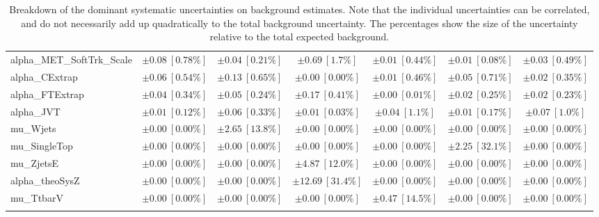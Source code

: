 \begin{sidewaystable}
\begin{center}
\begin{tabular*}{\textwidth}{@{\extracolsep{\fill}}lcccccc}
alpha\_MET\_SoftTrk\_Scale         & $\pm 0.08\ [0.78\%] $          & $\pm 0.04\ [0.21\%] $          & $\pm 0.69\ [1.7\%] $          & $\pm 0.01\ [0.44\%] $          & $\pm 0.01\ [0.08\%] $          & $\pm 0.03\ [0.49\%] $       \\
alpha\_CExtrap         & $\pm 0.06\ [0.54\%] $          & $\pm 0.13\ [0.65\%] $          & $\pm 0.00\ [0.00\%] $          & $\pm 0.01\ [0.46\%] $          & $\pm 0.05\ [0.71\%] $          & $\pm 0.02\ [0.35\%] $       \\
alpha\_FTExtrap         & $\pm 0.04\ [0.34\%] $          & $\pm 0.05\ [0.24\%] $          & $\pm 0.17\ [0.41\%] $          & $\pm 0.00\ [0.01\%] $          & $\pm 0.02\ [0.25\%] $          & $\pm 0.02\ [0.23\%] $       \\
alpha\_JVT         & $\pm 0.01\ [0.12\%] $          & $\pm 0.06\ [0.33\%] $          & $\pm 0.01\ [0.03\%] $          & $\pm 0.04\ [1.1\%] $          & $\pm 0.01\ [0.17\%] $          & $\pm 0.07\ [1.0\%] $       \\
mu\_Wjets         & $\pm 0.00\ [0.00\%] $          & $\pm 2.65\ [13.8\%] $          & $\pm 0.00\ [0.00\%] $          & $\pm 0.00\ [0.00\%] $          & $\pm 0.00\ [0.00\%] $          & $\pm 0.00\ [0.00\%] $       \\
mu\_SingleTop         & $\pm 0.00\ [0.00\%] $          & $\pm 0.00\ [0.00\%] $          & $\pm 0.00\ [0.00\%] $          & $\pm 0.00\ [0.00\%] $          & $\pm 2.25\ [32.1\%] $          & $\pm 0.00\ [0.00\%] $       \\
mu\_ZjetsE         & $\pm 0.00\ [0.00\%] $          & $\pm 0.00\ [0.00\%] $          & $\pm 4.87\ [12.0\%] $          & $\pm 0.00\ [0.00\%] $          & $\pm 0.00\ [0.00\%] $          & $\pm 0.00\ [0.00\%] $       \\
alpha\_theoSysZ         & $\pm 0.00\ [0.00\%] $          & $\pm 0.00\ [0.00\%] $          & $\pm 12.69\ [31.4\%] $          & $\pm 0.00\ [0.00\%] $          & $\pm 0.00\ [0.00\%] $          & $\pm 0.00\ [0.00\%] $       \\
mu\_TtbarV         & $\pm 0.00\ [0.00\%] $          & $\pm 0.00\ [0.00\%] $          & $\pm 0.00\ [0.00\%] $          & $\pm 0.47\ [14.5\%] $          & $\pm 0.00\ [0.00\%] $          & $\pm 0.00\ [0.00\%] $       \\
\noalign{\smallskip}\hline\noalign{\smallskip}
\end{tabular*}
\end{center}
\caption[Breakdown of uncertainty on background estimates]{
Breakdown of the dominant systematic uncertainties on background estimates.
Note that the individual uncertainties can be correlated, and do not necessarily add up quadratically to 
the total background uncertainty. The percentages show the size of the uncertainty relative to the total expected background.
\label{table.results.bkgestimate.uncertainties.VRZE_bybkg}}
\end{sidewaystable}
%